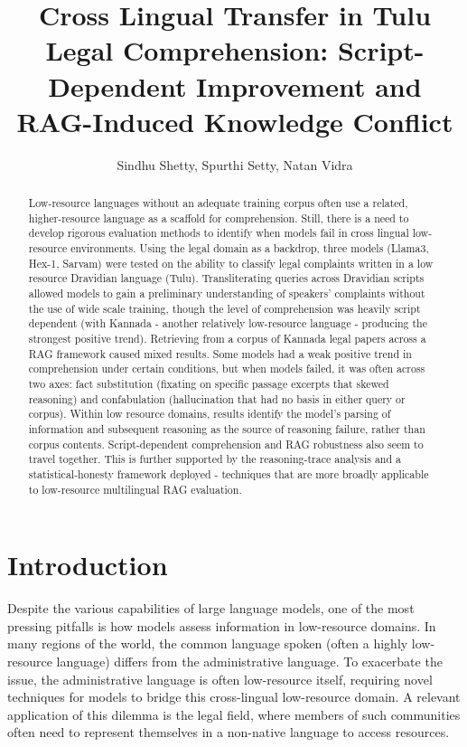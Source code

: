 \documentclass[11pt]{article}
\title{Cross Lingual Transfer in Tulu Legal Comprehension: Script-Dependent Improvement and RAG-Induced Knowledge Conflict}
\author{Sindhu Shetty, Spurthi Setty, Natan Vidra}
\begin{document}
\maketitle


\begin{abstract}

Low-resource languages without an adequate training corpus often use a related, higher-resource language as a scaffold for comprehension. Still, there is a need to develop rigorous evaluation methods to identify when models fail in cross lingual low-resource environments. Using the legal domain as a backdrop, three models (Llama3, Hex-1, Sarvam) were tested on the ability to classify legal complaints written in a low resource Dravidian language (Tulu). Transliterating queries across Dravidian scripts allowed models to gain a preliminary understanding of speakers' complaints without the use of wide scale training, though the level of comprehension was heavily script dependent (with Kannada - another relatively low-resource language - producing the strongest positive trend). Retrieving from a corpus of Kannada legal papers across a RAG framework caused mixed results. Some models had a weak positive trend in comprehension under certain conditions, but when models failed, it was often across two axes: fact substitution (fixating on specific passage excerpts that skewed reasoning) and confabulation (hallucination that had no basis in either query or corpus). Within low resource domains, results identify the model's parsing of information and subsequent reasoning as the source of reasoning failure, rather than corpus contents. Script-dependent comprehension and RAG robustness also seem to travel together. This is further supported by the reasoning-trace analysis and a statistical-honesty framework deployed - techniques that are more broadly applicable to low-resource multilingual RAG evaluation.

 
\end{abstract}

\section{Introduction}
Despite the various capabilities of large language models, one of the most pressing pitfalls is how models assess information in low-resource domains. In many regions of the world, the common language spoken (often a highly low-resource language) differs from the administrative language. To exacerbate the issue, the administrative language is often low-resource itself, requiring  novel techniques for models to bridge this cross-lingual low-resource domain. A relevant application of this dilemma is the legal field, where members of such communities often need to represent themselves in a non-native language to access resources.
\end{document}
